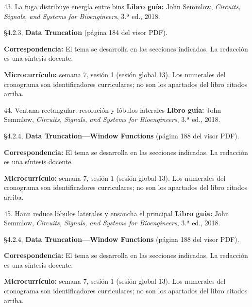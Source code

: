 \documentclass[
  10pt,
  ignorenonframetext,
  aspectratio=169,
  spanish,
]{beamer}
\begin{document}
\begin{frame}{43. La fuga distribuye energía entre bins}
\label{la-fuga-distribuye-energuxeda-entre-bins}
\textbf{Libro guía:} John Semmlow, \emph{Circuits, Signals, and Systems
for Bioengineers}, 3.ª ed., 2018.

§4.2.3, \textbf{Data Truncation} (página 184 del visor PDF).

\textbf{Correspondencia:} El tema se desarrolla en las secciones
indicadas. La redacción es una síntesis docente.

\textbf{Microcurrículo:} semana 7, sesión 1 (sesión global 13). Los
numerales del cronograma son identificadores curriculares; no son los
apartados del libro citados arriba.
\end{frame}

\begin{frame}{44. Ventana rectangular: resolución y lóbulos laterales}
\label{ventana-rectangular-resoluciuxf3n-y-luxf3bulos-laterales}
\textbf{Libro guía:} John Semmlow, \emph{Circuits, Signals, and Systems
for Bioengineers}, 3.ª ed., 2018.

§4.2.4, \textbf{Data Truncation---Window Functions} (página 188 del
visor PDF).

\textbf{Correspondencia:} El tema se desarrolla en las secciones
indicadas. La redacción es una síntesis docente.

\textbf{Microcurrículo:} semana 7, sesión 1 (sesión global 13). Los
numerales del cronograma son identificadores curriculares; no son los
apartados del libro citados arriba.
\end{frame}

\begin{frame}{45. Hann reduce lóbulos laterales y ensancha el principal}
\label{hann-reduce-luxf3bulos-laterales-y-ensancha-el-principal}
\textbf{Libro guía:} John Semmlow, \emph{Circuits, Signals, and Systems
for Bioengineers}, 3.ª ed., 2018.

§4.2.4, \textbf{Data Truncation---Window Functions} (página 188 del
visor PDF).

\textbf{Correspondencia:} El tema se desarrolla en las secciones
indicadas. La redacción es una síntesis docente.

\textbf{Microcurrículo:} semana 7, sesión 1 (sesión global 13). Los
numerales del cronograma son identificadores curriculares; no son los
apartados del libro citados arriba.
\end{frame}
\end{document}
